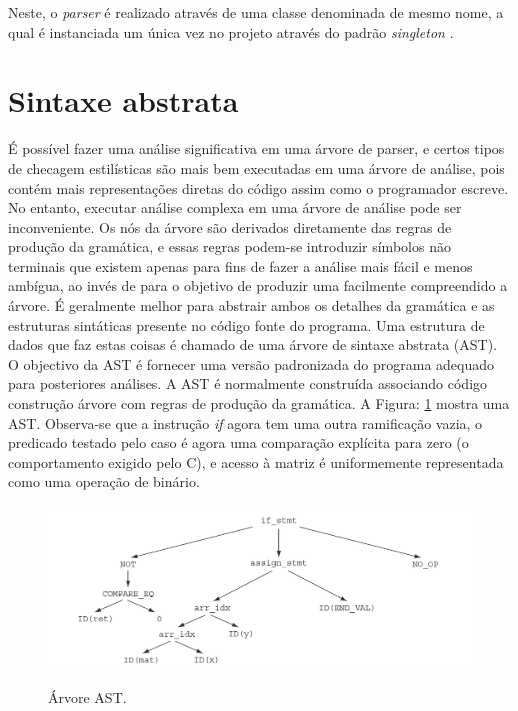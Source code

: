 	Neste, o \textit{parser} é realizado através de uma classe denominada de mesmo nome, a qual é instanciada um única vez no projeto através do padrão \textit{singleton} \cite{Gamma:1995}.
	

	\section{Sintaxe abstrata}
	É possível fazer uma análise significativa em uma árvore de parser, e certos tipos de checagem estilísticas são mais bem executadas em uma árvore de análise, pois contém mais representações diretas do código assim como o programador escreve. No entanto, executar análise complexa em uma árvore de análise pode ser inconveniente. Os nós da árvore são derivados diretamente das regras de produção da gramática, e essas regras podem-se introduzir símbolos não terminais que existem apenas para fins de fazer a análise mais fácil e menos ambígua, ao invés de para o objetivo de produzir uma facilmente compreendido a árvore. É geralmente melhor para abstrair ambos os detalhes da gramática e as estruturas sintáticas presente no código fonte do programa. Uma estrutura de dados que faz estas coisas é chamado de uma árvore de sintaxe abstrata (AST). O objectivo da AST é fornecer uma versão padronizada do programa adequado para posteriores análises. A AST é normalmente construída associando código construção árvore com regras de produção da gramática. A Figura: \ref{fig:ArvoreAST} mostra uma AST. Observa-se que a instrução {\it if} agora tem uma outra ramificação vazia, o predicado testado pelo caso é agora uma comparação explícita para zero (o comportamento exigido pelo C), e acesso à matriz é uniformemente representada como uma operação de binário.
	
	\begin{figure}[h]
		\center
		\includegraphics[width=1\textwidth]{Imagens/ArvoreAST}
		\label{fig:ArvoreAST}
		\caption{Árvore AST.}
	\end{figure}

